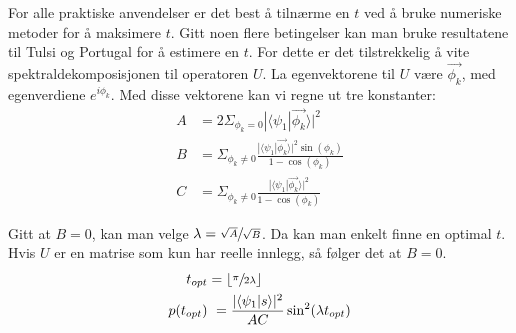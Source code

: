         For alle praktiske anvendelser er det best å tilnærme en $t$ ved å bruke numeriske metoder for å maksimere $t$. Gitt noen flere betingelser kan man bruke resultatene til Tulsi og Portugal for å estimere en $t$. For dette er det tilstrekkelig å vite spektraldekomposisjonen til operatoren $U$. La egenvektorene til $U$ være $\vec{\phi_k}$, med egenverdiene $e^{i\phi_k}$. Med disse vektorene kan vi regne ut tre konstanter:
        \begin{align*}
            A & = 2\Sigma_{\phi_k=0}|\langle\psi_1|\vec{\phi_k}\rangle|^2 \\
            B & = \Sigma_{\phi_k\neq 0}\frac{|\langle\psi_1|\vec{\phi_k}\rangle|^2\sin(\phi_k)}{1-\cos(\phi_k)} \\
            C & = \Sigma_{\phi_k\neq 0}\frac{|\langle\psi_1|\vec{\phi_k}\rangle|^2}{1-\cos(\phi_k)}
        \end{align*}

        Gitt at $B=0$, kan man velge $\lambda = \sfrac{\sqrt{A}}{\sqrt{B}}$. Da kan man enkelt finne en optimal $t$. Hvis $U$ er en matrise som kun har reelle innlegg, så følger det at $B=0$.
        \begin{align*}
            t_{opt} & = \lfloor \sfrac{\pi}{2\lambda} \rfloor \\
            p(t_{opt}) & = \frac{|\langle \psi_1|s\rangle|^2}{AC}\sin^2(\lambda t_{opt})
        \end{align*}